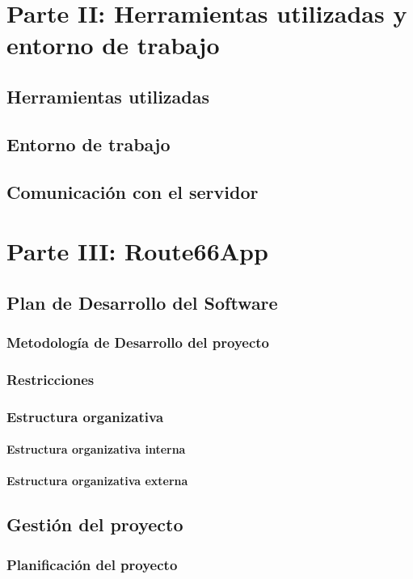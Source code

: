\documentclass[11pt,a4paper,twoside]{report}
\begin{document}
\chapter{Parte II: Herramientas utilizadas y entorno de trabajo}
\section{Herramientas utilizadas}
\section{Entorno de trabajo}
\section{Comunicación con el servidor}

\chapter{Parte III: Route66App}
\section{Plan de Desarrollo del Software}
\subsection{Metodología de Desarrollo del proyecto}
\subsection{Restricciones}
\subsection{Estructura organizativa}
\subsubsection{Estructura organizativa interna}
\subsubsection{Estructura organizativa externa}
\section{Gestión del proyecto}
\subsection{Planificación del proyecto}
\end{document}
